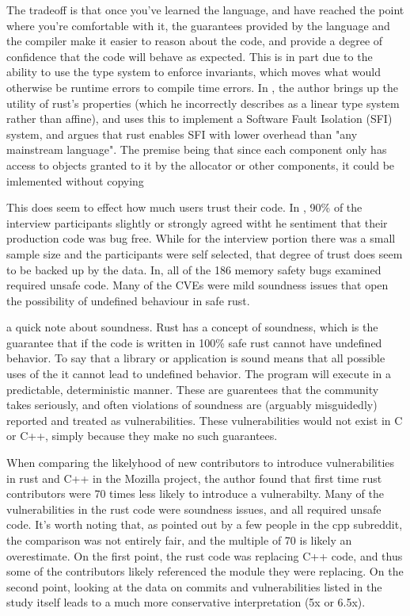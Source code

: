 \documentclass[conference]{IEEEtran}
\begin{document}
{
    The tradeoff is that once you've learned the language, and have reached the point where you're comfortable with it,
    the guarantees provided by the language and the compiler make it easier to reason about the code, and provide a degree
    of confidence that the code will behave as expected. This is in part due to the ability to use the type system to
    enforce invariants, which moves what would otherwise be runtime errors to compile time errors\cite{nosedaRustSecureIoT2022}.
    In \cite{balasubramanianSystemProgrammingRust2017}, the author brings up the utility of rust's properties (which he incorrectly describes as a linear type system rather than affine), and uses this to implement a Software Fault Isolation (SFI) system, and argues
    that rust enables SFI with lower overhead than "any mainstream language". The premise being that since each component only has access to objects granted to it by the allocator or other components, it could be imlemented without copying
}

{
    This does seem to effect how much users trust their code. In \cite{fultonBenefitsDrawbacksAdopting2021}, 90\% of the interview participants slightly or strongly agreed witht he sentiment that their production code was bug free. While for the interview
    portion there was a small sample size and the participants were self selected, that degree of trust does seem to be
    backed up by the data. In\cite{xuMemorySafetyChallengeConsidered2021}, all of the 186 memory safety bugs examined required
    unsafe code. Many of the CVEs were mild soundness issues that open the possibility of undefined behaviour in safe rust.
}

{
    a quick note about soundness. Rust has a concept of soundness, which is the guarantee that if the code is written in 100\% safe rust cannot have undefined behavior. To say that a library or application is sound means that all possible uses of the it cannot lead to undefined behavior.
    The program will execute in a predictable, deterministic manner. These are guarentees that the community takes seriously, and often violations of soundness are (arguably misguidedly) reported and treated as vulnerabilities\cite{xuMemorySafetyChallengeConsidered2021}\cite{traceyGradingCurveHow2023}.
    These vulnerabilities would not exist in C or C++, simply because they make no such guarantees.
}

{
    When comparing the likelyhood of new contributors to introduce vulnerabilities in rust and C++ in the Mozilla project, the author found that first time rust contributors were 70 times less likely to introduce a vulnerabilty.
    Many of the vulnerabilities in the rust code were soundness issues, and all required unsafe code\cite{traceyGradingCurveHow2023}. It's worth noting that, as pointed out by a few people in the cpp subreddit,
    the comparison was not entirely fair, and the multiple of 70 is likely an overestimate. On the first point, the rust code was replacing C++ code, and thus some of the contributors likely referenced the module they
    were replacing. On the second point, looking at the data on commits and vulnerabilities listed in the study itself leads to a much more conservative interpretation (5x or 6.5x).
}
\end{document}
